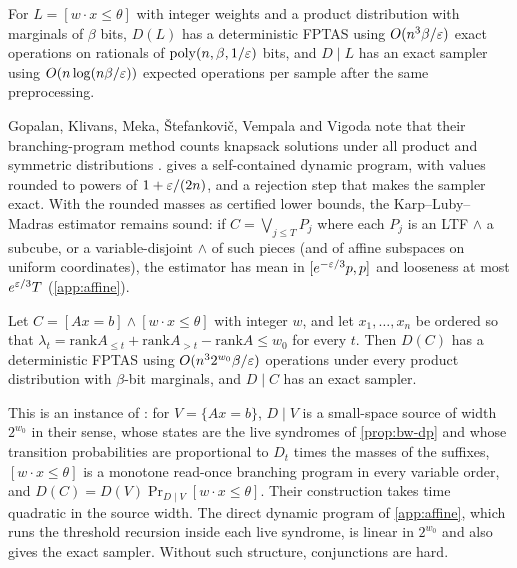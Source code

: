 \begin{proposition}\label{prop:ltf}
For $L=[w\cdot x\le\theta]$ with integer weights and a product distribution with
marginals of $\beta$ bits, $D(L)$ has a deterministic FPTAS using $O(n^3\beta/\varepsilon)$ exact
operations on rationals of $\mathrm{poly}(n,\beta,1/\varepsilon)$ bits, and $D\mid L$ has an exact sampler using
$O(n\log(n\beta/\varepsilon))$ expected operations per sample after the same preprocessing.
\end{proposition}

Gopalan, Klivans, Meka, \v{S}tefankovi\v{c}, Vempala and Vigoda note that their
branching-program method counts knapsack solutions under all product and symmetric
distributions \cite[Sec.~3.2]{gopalan2011fptas}.  gives a
self-contained dynamic program, with values rounded to powers of $1+\varepsilon/(2n)$, and a
rejection step that makes the sampler exact. With the rounded masses as certified
lower bounds, the Karp--Luby--Madras estimator remains sound: if
$C=\bigvee_{j\le T}P_j$ where each $P_j$ is an LTF $\wedge$ a subcube, or a
variable-disjoint $\wedge$ of such pieces (and of affine subspaces on uniform
coordinates), the estimator has mean in $[e^{-\varepsilon/3}p,p]$ and looseness at most
$e^{\varepsilon/3}T$ (\cref{app:affine}).

\begin{proposition}\label{prop:affine-ltf}
Let $C=[Ax=b]\wedge[w\cdot x\le\theta]$ with integer $w$, and let $x_1,\dots,x_n$ be
ordered so that $\lambda_t=\mathrm{rank}A_{\le t}+\mathrm{rank}A_{>t}-\mathrm{rank}A\le
w_0$ for every $t$. Then $D(C)$ has a deterministic FPTAS using
$O(n^32^{w_0}\beta/\varepsilon)$ operations under every product distribution with $\beta$-bit
marginals, and $D\mid C$ has an exact sampler.
\end{proposition}

This is an instance of \cite[Thm.~3.6 with Claim~3.4]{gopalan2011fptas}: for
$V=\{Ax=b\}$, $D\mid V$ is a small-space source of width $2^{w_0}$ in their sense, whose states are the live
syndromes of \cref{prop:bw-dp} and whose transition probabilities are proportional to
$D_t$ times the masses of the suffixes, $[w\cdot x\le\theta]$ is a monotone read-once
branching program in every variable order, and $D(C)=D(V)\Pr_{D\mid V}[w\cdot
x\le\theta]$. Their construction takes time quadratic in the source width. The direct
dynamic program of \cref{app:affine}, which runs the threshold recursion inside each
live syndrome, is linear in $2^{w_0}$ and also gives the exact sampler. Without such
structure, conjunctions are hard.

